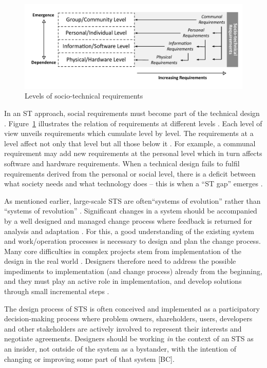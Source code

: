 %
%
\begin{figure}[b!]
\centering
\includegraphics[width=.82\linewidth]{img/sts_requirements.pdf}
\caption{Levels of socio-technical requirements \cite{Whitworth2009a}}
\label{fig:sts_requirements} 
\end{figure}
% 
%
In an ST approach, social requirements must become part of the technical design \cite{Whitworth2014}. Figure~\ref{fig:sts_requirements} illustrates the relation of requirements at different levels \cite{Whitworth2009a}. Each level of view unveils requirements which cumulate level by level. The requirements at a level affect not only that level but all those below it \cite{Whitworth2009a}. For example, a communal requirement may add new requirements at the personal level which in turn affects software and hardware requirements. When a technical design fails to fulfil requirements derived from the personal or social level, there is a deficit  between  what  society  needs  and  what technology does -- this is when a ``ST  gap''  emerges \cite{Whitworth2014}. 


As mentioned earlier, large-scale STS are often``systems of evolution'' rather than ``systems of revolution'' \cite{Baxter2011,Norman2015}. Significant changes in a system should be accompanied by a well designed and managed change process where feedback is returned for analysis and adaptation \cite{Baxter2011}. For this, a good understanding of the existing system and work/operation processes is necessary to design and plan the change process. Many core difficulties in complex projects stem from implementation of the design in the real world \cite{Norman2015}. Designers therefore need to address the possible impediments to implementation (and change process) already from the beginning, and they must play an active role in implementation, and develop solutions through small incremental steps \cite{Norman2015}.

 The design process of STS is often conceived and implemented as a participatory decision-making process where problem owners, shareholders, users, developers and other stakeholders are actively involved to represent their interests and negotiate agreements. 
Designers should be working \textit{in} the context of an STS as an insider, not outside of the system as a bystander, with the intention of changing or improving some part of that system [BC]. 

